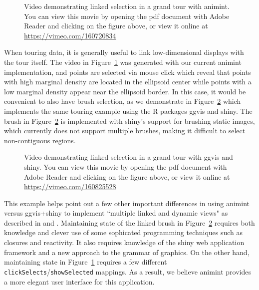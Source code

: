\documentclass[journal]{vgtc}\usepackage[]{graphicx}\usepackage[]{color}
\begin{document}
\begin{figure}[htp]
	\centerline{}
	\label{fig:tour}
	\caption{Video demonstrating linked selection in a grand tour with animint. You can view this movie by opening the pdf document with Adobe Reader and clicking on the figure above, or view it online at \url{https://vimeo.com/160720834}}
\end{figure}

When touring data, it is generally useful to link low-dimensional displays with
the tour itself. The video in Figure~\ref{fig:tour} was generated with our
current animint implementation, and points are selected via mouse click which
reveal that points with high marginal density are located in the
ellipsoid center while points with a low marginal density appear near the 
ellipsoid border. In this case, it would be convenient to also have brush 
selection, as we demonstrate in
Figure~\ref{fig:tourbrush} which implements the same touring example using the
R packages ggvis and shiny. The brush in Figure~\ref{fig:tourbrush} is 
implemented with shiny's support for brushing static images, which currently 
does not support multiple brushes, making it difficult to select
non-contiguous regions. 

\begin{figure}[htp]
	\centerline{}
	\label{fig:tourbrush}
	\caption{Video demonstrating linked selection in a grand tour with ggvis and shiny. You can view this movie by opening the pdf document with Adobe Reader and clicking on the figure above, or view it online at \url{https://vimeo.com/160825528}}
\end{figure}

This example helps point out a few other important differences in using 
animint versus ggvis+shiny to implement ``multiple linked and dynamic views" 
as described in \citep{Ahlberg:1991} and \citep{Buja:1991vh}. 
Maintaining state of the linked brush in Figure~\ref{fig:tourbrush} 
requires both knowledge and clever use of some sophicated programming 
techniques such as closures and reactivity. 
It also requires knowledge of the shiny web application framework and 
a new approach to the grammar of graphics. 
On the other hand, maintaining state in Figure~\ref{fig:tour} requires
a few different \texttt{clickSelects}/\texttt{showSelected} mappings. As a
result, we believe animint provides a more elegant user interface for 
this application.
\end{document}
